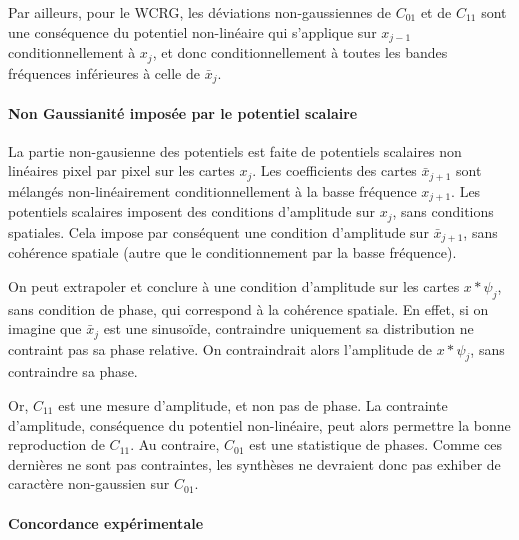 \documentclass[12pt,twoside]{article}
\begin{document}
Par ailleurs, pour le WCRG, les déviations non-gaussiennes de $C_{01}$ et de $C_{11}$ sont une conséquence du potentiel non-linéaire qui s'applique sur $x_{j-1}$ conditionnellement à $x_j$, et donc conditionnellement à toutes les bandes fréquences inférieures à celle de $\bar x_j$.

\paragraph*{Non Gaussianité imposée par le potentiel scalaire}

La partie non-gausienne des potentiels est faite de potentiels scalaires non linéaires pixel par pixel sur les cartes $x_j$. Les coefficients des cartes $\bar x_{j+1}$ sont mélangés non-linéairement conditionnellement à la basse fréquence $x_{j+1}$. Les potentiels scalaires imposent des conditions d'amplitude sur $x_j$, sans conditions spatiales.  Cela impose par conséquent une condition d'amplitude sur $\bar x_{j+1}$, sans cohérence spatiale (autre que le conditionnement par la basse fréquence). 

On peut extrapoler et conclure à une condition d'amplitude sur les cartes $x\ast\psi_j$, sans condition de phase, qui correspond à la cohérence spatiale.  En effet, si on imagine que $\bar x_j$ est une sinusoïde, contraindre uniquement sa distribution ne contraint pas sa phase relative. On contraindrait alors l'amplitude de $x*\psi_j$, sans contraindre sa phase.

Or, $C_{11}$ est une mesure d'amplitude, et non pas de phase. La contrainte d'amplitude, conséquence du potentiel non-linéaire, peut alors permettre la bonne reproduction de $C_{11}$. Au contraire, $C_{01}$ est une statistique de phases. Comme ces dernières ne sont pas contraintes, les synthèses ne devraient donc pas exhiber de caractère non-gaussien sur $C_{01}$.


\paragraph*{Concordance expérimentale}
\end{document}
